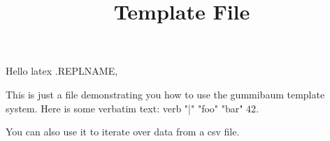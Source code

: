 \documentclass[a4paper]{scrartcl}
\title{Template File}
\begin{document}
\maketitle

Hello {{latex .REPLNAME}},

This is just a file demonstrating you how to use the gummibaum template system.
Here is some verbatim text: {{verb "|" "foo" "bar" 42}}.

You can also use it to iterate over data from a csv file.
\end{document}
